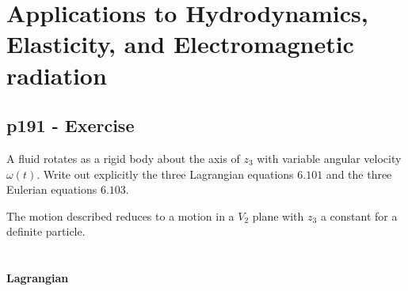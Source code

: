 \setcounter{chapter}{4}
\chapter{Applications to Hydrodynamics, Elasticity, and Electromagnetic radiation}
\pagebreak[4]
\section{p191 - Exercise}
\begin{tcolorbox}
A fluid rotates as a rigid body about the axis of $z_3$ with variable angular velocity $\omega(t)$. Write out explicitly the three Lagrangian equations $\mathbf{6.101}$ and the three Eulerian equations $\mathbf{6.103}$.
\end{tcolorbox}
The motion described reduces to a motion in a $V_2$ plane with $z_3$ a constant for a definite particle.\\\\\\
\textbf{Lagrangian}\\

